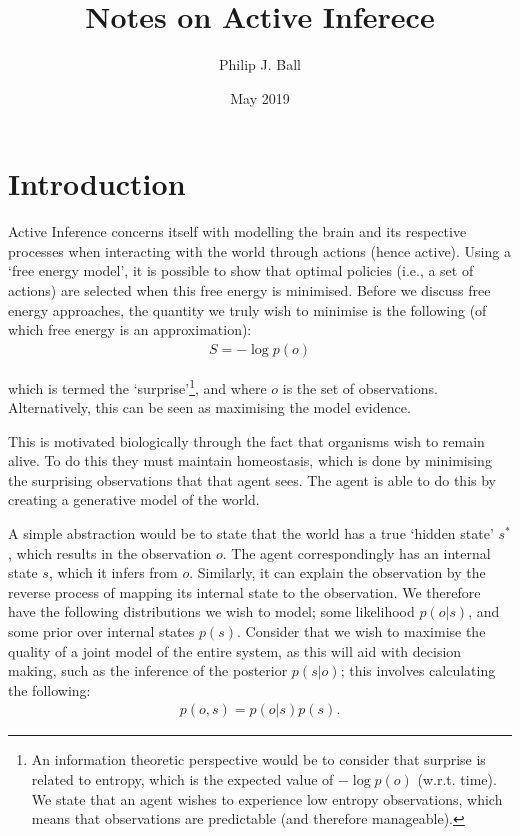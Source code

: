\documentclass{article}
\title{Notes on Active Inferece}
\author{Philip J. Ball}
\date{May 2019}
\begin{document}
\maketitle

\section{Introduction}

Active Inference concerns itself with modelling the brain and its respective processes when interacting with the world through actions (hence active). Using a `free energy model', it is possible to show that optimal policies (i.e., a set of actions) are selected when this free energy is minimised. Before we discuss free energy approaches, the quantity we truly wish to minimise is the following (of which free energy is an approximation):
\begin{align}
    S = - \log p(o)
\end{align}

which is termed the `surprise'\footnote{An information theoretic perspective would be to consider that surprise is related to entropy, which is the expected value of $-\log p(o)$ (w.r.t. time). We state that an agent wishes to experience low entropy observations, which means that observations are predictable (and therefore manageable).}, and where $o$ is the set of observations. Alternatively, this can be seen as maximising the model evidence.

This is motivated biologically through the fact that organisms wish to remain alive. To do this they must maintain homeostasis, which is done by minimising the surprising observations that that agent sees. The agent is able to do this by creating a generative model of the world.

A simple abstraction would be to state that the world has a true `hidden state' $s^*$, which results in the observation $o$. The agent correspondingly has an internal state $s$, which it infers from $o$. Similarly, it can explain the observation by the reverse process of mapping its internal state to the observation. We therefore have the following distributions we wish to model; some likelihood $p(o|s)$, and some prior over internal states $p(s)$. Consider that we wish to maximise the quality of a joint model of the entire system, as this will aid with decision making, such as the inference of the posterior $p(s|o)$; this involves calculating the following:
\begin{align}
    p(o,s) = p(o|s)p(s).
\end{align}
\end{document}
